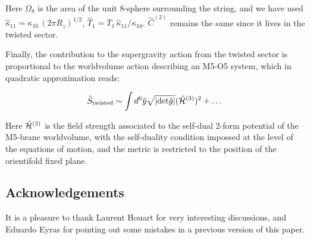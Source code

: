 \documentclass[12pt,a4paper]{article}
\begin{document}
\noindent Here $\Omega_8$ is the area of the unit 8-sphere 
surrounding the string, and we have used 
${\hat \kappa}_{11}=\kappa_{10}\,(2\pi R_z)^{1/2}$,
${\hat T}_1=T_1 \,{\hat \kappa}_{11}/\kappa_{10}$. 
${\hat C}^{(2)}$ remains the same since it lives
in the twisted sector.


Finally, the contribution to the supergravity action from the twisted sector
is proportional to the worldvolume action describing an M5-O5 system, 
which in quadratic approximation reads:

\begin{equation}
{\hat S}_{{\rm twisted}}\sim\int d^6 {\hat y} \sqrt{|{\rm det}
{\hat g}|} ({\hat {\cal H}}^{(3)})^2+\dots
\end{equation}

\noindent Here ${\hat {\cal H}}^{(3)}$ is the field strength associated
to the self-dual 2-form potential of the M5-brane worldvolume, with
the self-duality condition impossed at the level
of the equations of motion, and the metric is restricted to the position
of the orientifold fixed plane.

 
\subsection*{Acknowledgements}

It is a pleasure to thank Laurent Houart for very interesting discussions,
and Eduardo Eyras for pointing out some mistakes in a previous version
of this paper.
\end{document}
